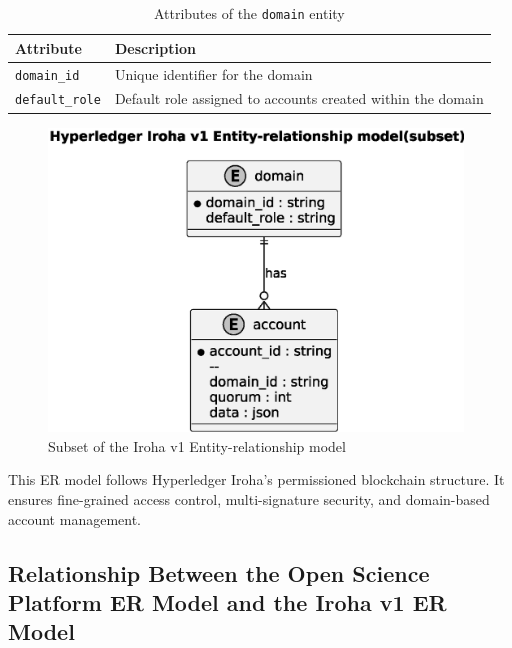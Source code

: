 \documentclass{article}
\begin{document}
\begin{table}[h]
      \centering
      \renewcommand{\arraystretch}{1.2}
      \caption{Attributes of the \texttt{domain} entity}
      \label{tab:domain_entity}
      \begin{tabularx}{\textwidth}{|l|X|}
            \hline
            \textbf{Attribute}     & \textbf{Description}                                        \\ \hline
            \texttt{domain\_id}    & Unique identifier for the domain                            \\ \hline
            \texttt{default\_role} & Default role assigned to accounts created within the domain \\ \hline
      \end{tabularx}
\end{table}



\begin{figure}[htbp]
      \centering
      \includegraphics[width=0.98\textwidth, keepaspectratio]{iroha_v1_er_model.eps}
      \caption{Subset of the Iroha v1 Entity-relationship model}
      \label{fig:iroha_v1_er_model}
\end{figure}


This ER model follows Hyperledger Iroha’s permissioned blockchain structure. It ensures fine-grained access control, multi-signature security, and domain-based account management.


\subsection{Relationship Between the Open Science Platform ER Model and the Iroha v1 ER Model}
\end{document}
